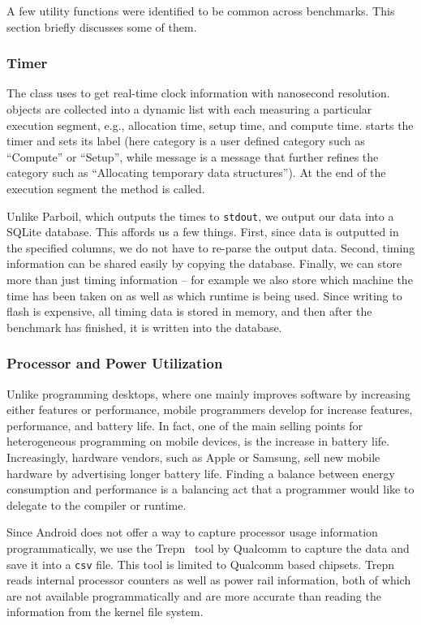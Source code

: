 A few utility functions were identified to be common across benchmarks.
This section briefly discusses some of them.

\subsubsection{Timer}
The  class uses  to get real-time clock information 
	with nanosecond resolution.
 objects are collected into a dynamic list with each measuring
	a particular execution segment, e.g., allocation time, setup time, and compute
time. 
 starts the timer and sets its label (here category is a user defined category such as
``Compute'' or ``Setup'', while message is a message that further refines the
category such as ``Allocating temporary data structures''). At the end of the
execution segment the  method is called. 

Unlike Parboil, which outputs the times to {\tt stdout}, we output our data into
a SQLite database.  This affords us a few things.  First, since data is
outputted in the specified columns, we do not have to re-parse the output data.
Second, timing information can be shared easily by copying the database.
Finally, we can store more than just timing information -- for example we also
store which machine the time has been taken on as well as which runtime is being
used.  Since writing to flash is expensive, all timing data is stored in memory,
and then after the benchmark has finished, it is written into the database. 

\subsubsection{Processor and Power Utilization}

Unlike programming desktops, where one mainly 
  improves software by increasing either features or performance,
  mobile programmers develop for increase features, performance, and 
  battery life.
In fact, one of the main selling points for heterogeneous
  programming on mobile devices, is the increase in battery life.
Increasingly, hardware vendors, such as Apple or Samsung, sell new
  mobile hardware by advertising longer battery life.
Finding a balance between energy consumption and performance is a 
  balancing act that a programmer would like to delegate to the 
  compiler or runtime.

Since Android does not offer a way to capture processor usage information
programmatically, we use the Trepn~\cite{profilerqualcomm} tool by Qualcomm to capture the data and save it into a {\tt csv} file.
This tool is limited to Qualcomm based
chipsets. Trepn reads internal processor counters as well as power rail information,
both of which are not available programmatically and are more accurate than reading
the information from the  kernel file system.

